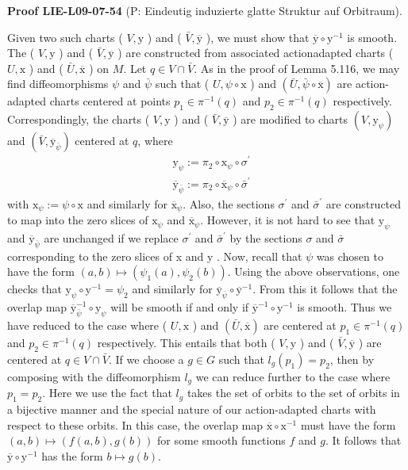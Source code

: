 \documentclass[10pt, letterpaper]{article}
\newcommand{\CustomHeading}[3]{%
  \par\medskip\noindent%
  \textbf{#1 #2} \textnormal{(#3)}.\enskip%
}
\newenvironment{PROOF}[2]{\CustomHeading{Proof}{#1}{#2}}{}
\begin{document}
\begin{PROOF}{LIE-L09-07-54}{P: Eindeutig induzierte glatte Struktur auf Orbitraum}
Given two such charts ( $V, \mathrm{y}$ ) and ( $\bar{V}, \overline{\mathrm{y}}$ ), we must show that $\overline{\mathrm{y}} \circ \mathrm{y}^{-1}$ is smooth. The ( $V, \mathrm{y}$ ) and ( $\bar{V}, \overline{\mathrm{y}}$ ) are constructed from associated actionadapted charts ( $U, \mathrm{x}$ ) and ( $\bar{U}, \overline{\mathrm{x}}$ ) on $M$. Let $q \in V \cap \bar{V}$. As in the proof of Lemma 5.116, we may find diffeomorphisms $\psi$ and $\bar{\psi}$ such that ( $U, \psi \circ \mathrm{x}$ ) and $(\bar{U}, \bar{\psi} \circ \overline{\mathrm{x}})$ are action-adapted charts centered at points $p_{1} \in \pi^{-1}(q)$ and $p_{2} \in \pi^{-1}(q)$ respectively. Correspondingly, the charts ( $V, \mathrm{y}$ ) and ( $\bar{V}, \overline{\mathrm{y}}$ ) are modified to charts $\left(V, \mathrm{y}_{\psi}\right)$ and $\left(\bar{V}, \overline{\mathrm{y}}_{\bar{\psi}}\right)$ centered at $q$, where
$$
\begin{aligned}
& \mathrm{y}_{\psi}:=\pi_{2} \circ \mathrm{x}_{\psi} \circ \sigma^{\prime} \\
& \overline{\mathrm{y}}_{\bar{\psi}}:=\pi_{2} \circ \overline{\mathrm{x}}_{\psi} \circ \bar{\sigma}^{\prime}
\end{aligned}
$$
with $\mathrm{x}_{\psi}:=\psi \circ \mathrm{x}$ and similarly for $\overline{\mathrm{x}}_{\psi}$. Also, the sections $\sigma^{\prime}$ and $\bar{\sigma}^{\prime}$ are constructed to map into the zero slices of $\mathrm{x}_{\psi}$ and $\overline{\mathrm{x}}_{\psi}$. However, it is not hard to see that $\mathrm{y}_{\psi}$ and $\overline{\mathrm{y}}_{\bar{\psi}}$ are unchanged if we replace $\sigma^{\prime}$ and $\bar{\sigma}^{\prime}$ by the sections $\sigma$ and $\bar{\sigma}$ corresponding to the zero slices of x and y . Now, recall that $\psi$ was chosen to have the form $(a, b) \mapsto\left(\psi_{1}(a), \psi_{2}(b)\right)$. Using the above observations, one checks that $\mathrm{y}_{\psi} \circ \mathrm{y}^{-1}=\psi_{2}$ and similarly for $\overline{\mathrm{y}}_{\bar{\psi}} \circ \overline{\mathrm{y}}^{-1}$. From this it follows that the overlap map $\overline{\mathrm{y}}_{\bar{\psi}}^{-1} \circ \mathrm{y}_{\psi}$ will be smooth if and only if $\overline{\mathrm{y}}^{-1} \circ \mathrm{y}^{-1}$ is smooth. Thus we have reduced to the case where ( $U, \mathrm{x}$ ) and $(\bar{U}, \overline{\mathrm{x}})$ are centered at $p_{1} \in \pi^{-1}(q)$ and $p_{2} \in \pi^{-1}(q)$ respectively. This entails that both ( $V, \mathrm{y}$ ) and ( $\bar{V}, \overline{\mathrm{y}}$ ) are centered at $q \in V \cap \bar{V}$. If we choose a $g \in G$ such that $l_{g}\left(p_{1}\right)=p_{2}$, then by composing with the diffeomorphism $l_{g}$ we can reduce further to the case where $p_{1}=p_{2}$. Here we use the fact that $l_{g}$ takes the set of orbits to the set of orbits in a bijective manner and the special nature of our action-adapted charts with respect to these orbits. In this case, the overlap map $\overline{\mathrm{x}} \circ \mathrm{x}^{-1}$ must have the form $(a, b) \mapsto(f(a, b), g(b))$ for some smooth functions $f$ and $g$. It follows that $\overline{\mathrm{y}} \circ \mathrm{y}^{-1}$ has the form $b \mapsto g(b)$.


\end{PROOF}
\end{document}
